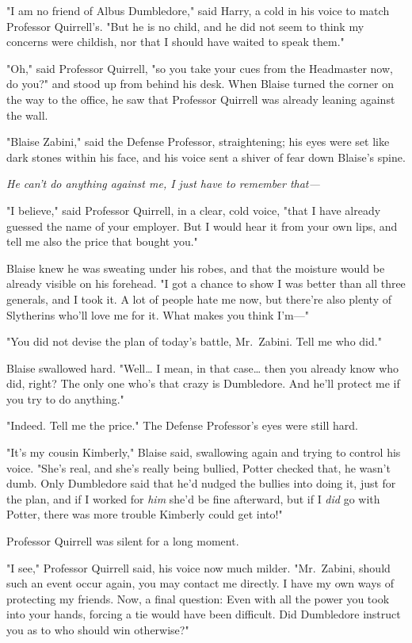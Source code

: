 "I am no friend of Albus Dumbledore," said Harry, a cold in his voice to match
Professor Quirrell's. "But he is no child, and he did not seem to think my
concerns were childish, nor that I should have waited to speak them."

"Oh," said Professor Quirrell, "so you take your cues from the Headmaster now,
do you?" and stood up from behind his desk.
\later
When Blaise turned the corner on the way to the office, he saw that Professor
Quirrell was already leaning against the wall.

"Blaise Zabini," said the Defense Professor, straightening; his eyes were set
like dark stones within his face, and his voice sent a shiver of fear down
Blaise's spine.

\emph{He can't do anything against me, I just have to remember that---}

"I believe," said Professor Quirrell, in a clear, cold voice, "that I have
already guessed the name of your employer. But I would hear it from your own
lips, and tell me also the price that bought you."

Blaise knew he was sweating under his robes, and that the moisture would be
already visible on his forehead. "I got a chance to show I was better than all
three generals, and I took it. A lot of people hate me now, but there're also
plenty of Slytherins who'll love me for it. What makes you think I'm---"

"You did not devise the plan of today's battle, Mr.~Zabini. Tell me who did."

Blaise swallowed hard. "Well{\ldots} I mean, in that case{\ldots} then you
already know who did, right? The only one who's that crazy is Dumbledore. And
he'll protect me if you try to do anything."

"Indeed. Tell me the price." The Defense Professor's eyes were still hard.

"It's my cousin Kimberly," Blaise said, swallowing again and trying to control
his voice. "She's real, and she's really being bullied, Potter checked that, he
wasn't dumb. Only Dumbledore said that he'd nudged the bullies into doing it,
just for the plan, and if I worked for \emph{him} she'd be fine afterward, but
if I \emph{did} go with Potter, there was more trouble Kimberly could get into!"

Professor Quirrell was silent for a long moment.

"I see," Professor Quirrell said, his voice now much milder. "Mr.~Zabini,
should such an event occur again, you may contact me directly. I have my own
ways of protecting my friends. Now, a final question: Even with all the power
you took into your hands, forcing a tie would have been difficult. Did
Dumbledore instruct you as to who should win otherwise?"

